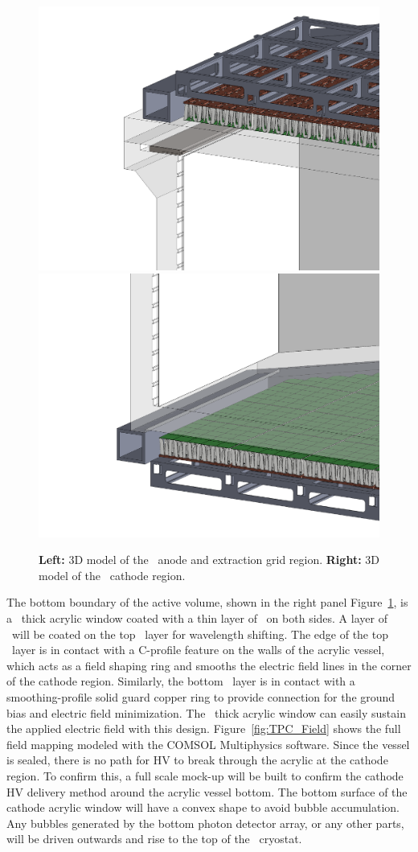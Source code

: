 \begin{figure}[t!]
\centering
\includegraphics[width=0.49\columnwidth]{./Figures/TPC-anode.pdf}
\includegraphics[width=0.49\columnwidth]{./Figures/TPC-cathode.pdf}
\caption[\DSks\ \LArTPC\ anode and cathode regions]{{\bf Left:} 3D model of the \LArTPC\ anode and extraction grid region.  {\bf Right:} 3D model of the \LArTPC\ cathode region.}
\label{fig:TPC_anode_cathode}
\end{figure}

The bottom boundary of the active volume, shown in the right panel Figure~\ref{fig:TPC_anode_cathode}, is a \DSkPMMATPCThickness\ thick acrylic window coated with a thin layer of \Clevios\ on both sides. A layer of \TPB\ will be coated on the top \Clevios\ layer for wavelength shifting. The edge of the top \Clevios\ layer is in contact with a C-profile feature on the walls of the acrylic vessel, which acts as a field shaping ring and smooths the electric field lines in the corner of the cathode region. Similarly, the bottom \Clevios\ layer is in contact with a smoothing-profile solid guard copper ring to provide connection for the ground bias and electric field minimization. The  \DSkPMMATPCThickness\ thick acrylic window can easily sustain the applied electric field with this design. Figure~\ref{fig:TPC_Field} shows the full field mapping modeled with the COMSOL Multiphysics software. Since the vessel is sealed, there is no path for HV to break through the acrylic at the cathode region. To confirm this, a full scale mock-up will be built to confirm the cathode HV delivery method around the acrylic vessel bottom.   The bottom surface of the cathode acrylic window will have a convex shape to avoid bubble accumulation.  Any bubbles generated by the bottom photon detector array, or any other parts, will be driven outwards and rise to the top of the \AAr\ cryostat.


